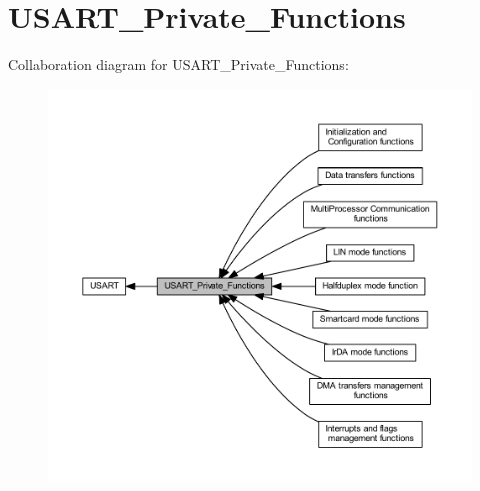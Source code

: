 \hypertarget{group___u_s_a_r_t___private___functions}{}\section{U\+S\+A\+R\+T\+\_\+\+Private\+\_\+\+Functions}
\label{group___u_s_a_r_t___private___functions}
Collaboration diagram for U\+S\+A\+R\+T\+\_\+\+Private\+\_\+\+Functions\+:
\nopagebreak
\begin{figure}[H]
\begin{center}
\leavevmode
\includegraphics[width=350pt]{group___u_s_a_r_t___private___functions}
\end{center}
\end{figure}
